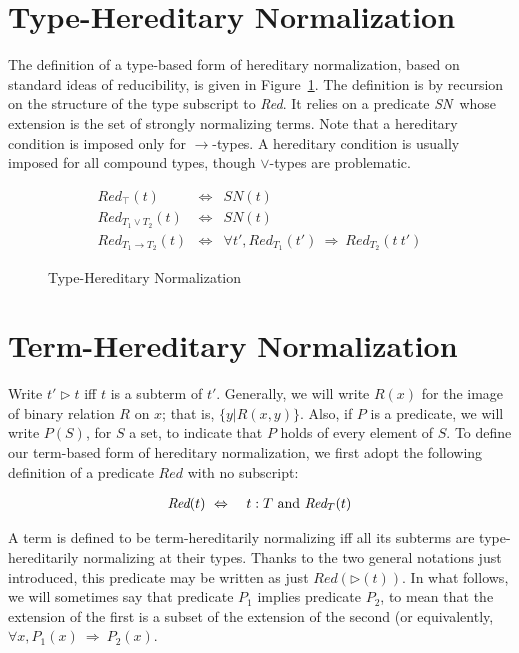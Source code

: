 \documentclass{article}
\newcommand{\red}[0]{\textit{Red}}
\newcommand{\sn}[0]{\textit{SN}}
\newcommand{\To}{\Rightarrow}
\begin{document}
\section{Type-Hereditary Normalization}

The definition of a type-based form of hereditary normalization, based
on standard ideas of reducibility, is given in
Figure~\ref{fig:type-hn}.  The definition is by recursion on the
structure of the type subscript to \red.  It relies on a predicate
\sn\ whose extension is the set of strongly normalizing terms.  Note
that a hereditary condition is imposed only for $\to$-types.  A
hereditary condition is usually imposed for all compound types, though
$\vee$-types are problematic.

\begin{figure}
\begin{eqnarray*}
\red_{\top}(t) & \Leftrightarrow & \sn(t) \\
\red_{T_1\vee T_2}(t) & \Leftrightarrow & \sn(t) \\
\red_{T_1\to T_2}(t) & \Leftrightarrow & \forall t', \red_{T_1}(t')\ \To\ \red_{T_2}(t\ t')
\end{eqnarray*}
\caption{\label{fig:type-hn} Type-Hereditary Normalization}
\end{figure}

\section{Term-Hereditary Normalization}

Write $t' \rhd t$ iff $t$ is a subterm of $t'$.  Generally, we will
write $R(x)$ for the image of binary relation $R$ on $x$; that is, $\{
y | R(x,y) \}$.  Also, if $P$ is a predicate, we will write $P(S)$,
for $S$ a set, to indicate that $P$ holds of every element of $S$.  To
define our term-based form of hereditary normalization, we first adopt
the following definition of a predicate $\red$ with no subscript:

\begin{eqnarray*}
\red(t) &\ \Leftrightarrow\ & t : T\ \textnormal{and}\ \red_{T}(t)
\end{eqnarray*}

\noindent A term is defined to be term-hereditarily normalizing iff
all its subterms are type-hereditarily normalizing at their types.
Thanks to the two general notations just introduced, this predicate
may be written as just $\red(\rhd(t))$.  In what follows, we will
sometimes say that predicate $P_1$ implies predicate $P_2$, to mean
that the extension of the first is a subset of the extension of the
second (or equivalently, $\forall x, P_1(x)\ \To\ P_2(x)$.
\end{document}
